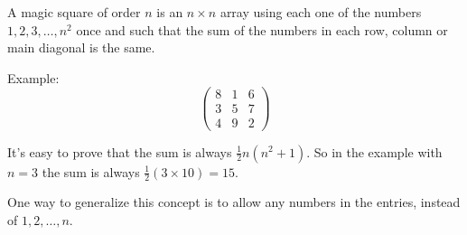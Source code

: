 \documentclass{article}
\begin{document}
A magic square of order $n$ is an $n\times n$ array using each one of the numbers $1,2,3,\ldots,n^2$ once and such that the sum of the numbers in each row, column or main diagonal is the same.

Example:
\begin{equation*}
\begin{pmatrix}
8 & 1 & 6\\
3 & 5 & 7\\
4 & 9  & 2
\end{pmatrix}
\end{equation*}

It's easy to prove that the sum is always $\frac{1}{2}n(n^2+1)$. So in the example with $n=3$ the sum is always $\frac{1}{2}(3\times 10)=15$.

One way to generalize this concept is to allow any numbers in the entries, instead of $1,2,\ldots,n$.
\end{document}
